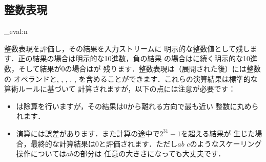 \documentclass[dvipdfmx,full,kernel]{wtpl3doc}
\newcommand{\code}[1]{\eghostguarded{\texttt{#1}}}
\begin{document}
\begin{documentation}
\section{整数表現}
%
\begin{function}[EXP]{\int_eval:n}
  \begin{syntax}
     
  \end{syntax}
%
  整数表現を評価し，その結果を入力ストリームに
  明示的な整数値として残します．正の結果の場合は明示的な10進数，負の結果
  の場合は\code{-}に続く明示的な10進数，そして結果が0の場合は\code{0}が
  残ります．整数表現は（展開された後）には整数の
  オペランドと\code{+}, \code{-}, \code{*}, \code{/}, \code{(}, \code{)}%
  を含めることができます．これらの演算結果は標準的な算術ルールに基づいて
  計算されますが，以下の点には注意が必要です：
%
  \begin{itemize}
%
  \item \code{/}は除算を行いますが，その結果は0から離れる方向で最も近い
    整数に丸められます．
%
%
  \item 演算には誤差があります．また計算の途中で$2^{31}-1$を超える結果が
    生じた場合，最終的な計算結果は0と評価されます．ただし$a$\code{*}$b$%
    \code{/}$c$のようなスケーリング操作については$a$\code{*}$b$の部分は
    任意の大きさになっても大丈夫です．
%

\end{itemize}
\end{function}
\end{documentation}
\end{document}
